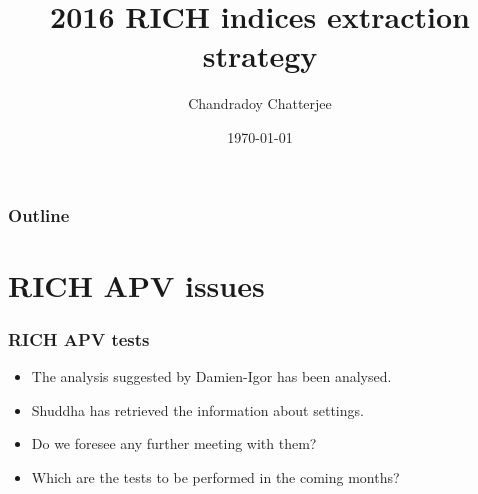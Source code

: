 \documentclass{beamer}
\title{\textbf{2016 RICH indices extraction strategy}}
\author{Chandradoy Chatterjee}
\institute{INFN Trieste}
\date{\today}
\begin{document}
    
    \begin{frame}[noframenumbering]
        \titlepage
    \end{frame}
    
    \begin{frame}\frametitle{Outline}
        \tableofcontents
    \end{frame}
    
\section{RICH APV issues}
    \begin{frame}
        \frametitle{RICH APV tests}
            \begin{itemize}
                \item The analysis suggested by Damien-Igor has been analysed.
                \item Shuddha has retrieved the information about settings.
                \item Do we foresee any further meeting with them?
                \item Which are the tests to be performed in the coming months?
            \end{itemize}
    \end{frame}
\end{document}
